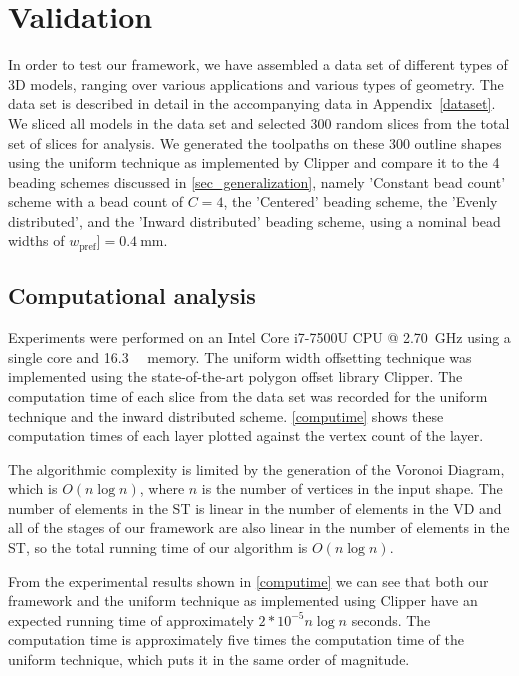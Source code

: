 \section{Validation}
In order to test our framework, we have assembled a data set of different types of 3D models, ranging over various applications and various types of geometry.
The data set is described in detail in the accompanying data in Appendix~\ref{dataset}.
We sliced all models in the data set and selected 300 random slices from the total set of slices for analysis.
We generated the toolpaths on these 300 outline shapes using the uniform technique as implemented by Clipper and compare it to the 4 beading schemes discussed in \cref{sec_generalization}, namely 'Constant bead count' scheme with a bead count of $C=4$, the 'Centered' beading scheme, the 'Evenly distributed', and the 'Inward distributed' beading scheme, using a nominal bead widths of $w_\text{pref}] = \SI{0.4}{\milli\meter}$.



\subsection{Computational analysis}
Experiments were performed on an Intel Core i7-7500U CPU @ \SI{2.70}{\giga\hertz} using a single core and \SI{16.3}{\giga\byte} memory.
The uniform width offsetting technique was implemented using the state-of-the-art polygon offset library Clipper. \cite{johnson2014clipper}
The computation time of each slice from the data set was recorded for the uniform technique and the inward distributed scheme. 
\cref{computime} shows these computation times of each layer plotted against the vertex count of the layer.

The algorithmic complexity is limited by the generation of the Voronoi Diagram, which is $O(n \log n)$, where $n$ is the number of vertices in the input shape.
The number of elements in the ST is linear in the number of elements in the VD
and all of the stages of our framework are also linear in the number of elements in the ST,
so the total running time of our algorithm is $O(n \log n)$.

From the experimental results shown in \cref{computime} we can see that both our framework and the uniform technique as implemented using Clipper have an expected running time of approximately $2*10^{-5} n \log n$ seconds.
The computation time is approximately five times the computation time of the uniform technique, which puts it in the same order of magnitude.

